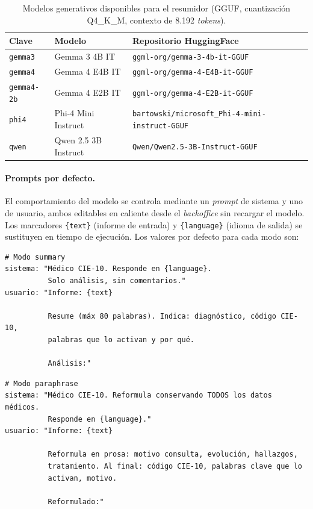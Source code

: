 \begin{table}[ht]
\centering
\small
\caption{Modelos generativos disponibles para el resumidor (GGUF, cuantización Q4\_K\_M, contexto de 8.192 \emph{tokens}).}
\label{tab:summarizer-modelos}
\begin{tabular}{lll}
\hline
\textbf{Clave} & \textbf{Modelo} & \textbf{Repositorio HuggingFace} \\
\hline
\texttt{gemma3}    & Gemma 3 4B IT       & \texttt{ggml-org/gemma-3-4b-it-GGUF} \\
\texttt{gemma4}    & Gemma 4 E4B IT      & \texttt{ggml-org/gemma-4-E4B-it-GGUF} \\
\texttt{gemma4-2b} & Gemma 4 E2B IT      & \texttt{ggml-org/gemma-4-E2B-it-GGUF} \\
\texttt{phi4}      & Phi-4 Mini Instruct & \texttt{bartowski/microsoft\_Phi-4-mini-instruct-GGUF} \\
\texttt{qwen}      & Qwen 2.5 3B Instruct & \texttt{Qwen/Qwen2.5-3B-Instruct-GGUF} \\
\hline
\end{tabular}
\end{table}

\paragraph{Prompts por defecto.} El comportamiento del modelo se controla mediante un \emph{prompt} de sistema y uno de usuario, ambos editables en caliente desde el \emph{backoffice} sin recargar el modelo. Los marcadores \texttt{\{text\}} (informe de entrada) y \texttt{\{language\}} (idioma de salida) se sustituyen en tiempo de ejecución. Los valores por defecto para cada modo son:

{\small
\begin{verbatim}
# Modo summary
sistema: "Médico CIE-10. Responde en {language}.
          Solo análisis, sin comentarios."
usuario: "Informe: {text}

          Resume (máx 80 palabras). Indica: diagnóstico, código CIE-10,
          palabras que lo activan y por qué.

          Análisis:"
\end{verbatim}
}

{\small
\begin{verbatim}
# Modo paraphrase
sistema: "Médico CIE-10. Reformula conservando TODOS los datos médicos.
          Responde en {language}."
usuario: "Informe: {text}

          Reformula en prosa: motivo consulta, evolución, hallazgos,
          tratamiento. Al final: código CIE-10, palabras clave que lo
          activan, motivo.

          Reformulado:"
\end{verbatim}
}

